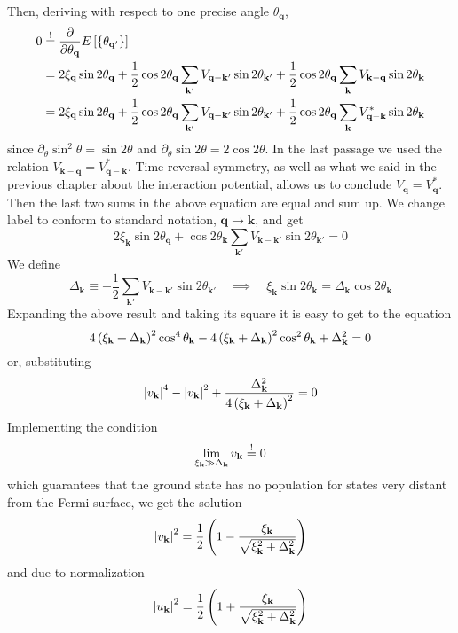 Then, deriving with respect to one precise angle $\theta_\mathbf{q}$,
\[
\begin{aligned}
	0 &\stackrel{!}{=} \pdv{}{\theta_\mathbf{q}} E\left[{\left\{{\theta_{\mathbf{q}'}}\right\}}\right] \\
	&= 2 \xi_\mathbf{q} \sin2\theta_\mathbf{q} + \frac{1}{2} 
	\cos2\theta_\mathbf{q} \sum_{\mathbf{k}'} V_{\mathbf{q}-\mathbf{k}'} \sin2\theta_{\mathbf{k}'} + \frac{1}{2} 
	\cos2\theta_\mathbf{q} \sum_\mathbf{k} V_{\mathbf{k}-\mathbf{q}} \sin2\theta_\mathbf{k} \\
	&= 2 \xi_\mathbf{q} \sin2\theta_\mathbf{q} + \frac{1}{2} 
	\cos2\theta_\mathbf{q} \sum_{\mathbf{k}'} V_{\mathbf{q}-\mathbf{k}'} \sin2\theta_{\mathbf{k}'} + \frac{1}{2} 
	\cos2\theta_\mathbf{q} \sum_\mathbf{k} V_{\mathbf{q}-\mathbf{k}}^* \sin2\theta_\mathbf{k}
\end{aligned}
\]
since $\partial_\theta \sin^2 \theta = \sin2\theta$ and $\partial_\theta \sin 2\theta = 2 \cos 2\theta$. In the last passage we used the relation $V_{\mathbf{k}-\mathbf{q}} = V_{\mathbf{q}-\mathbf{k}}^*$. Time-reversal symmetry, as well as what we said in the previous chapter about the interaction potential, allows us to conclude $V_\mathbf{q} = V_\mathbf{q}^*$. Then the last two sums in the above equation are equal and sum up. We change label to conform to standard notation, $\mathbf{q} \to \mathbf{k}$, and get
\[
	2 \xi_\mathbf{k} \sin2\theta_\mathbf{q} + 
	\cos2\theta_\mathbf{k} \sum_{\mathbf{k}'} V_{\mathbf{k}-\mathbf{k}'} \sin2\theta_{\mathbf{k}'} = 0
\]
We define
\begin{equation}\label{eq:delta variational definition}
	\Delta_\mathbf{k} \equiv - \frac{1}{2} 
	\sum_{\mathbf{k}'} V_{\mathbf{k}-\mathbf{k}'} \sin2\theta_{\mathbf{k}'}
	\quad\implies\quad
	\xi_\mathbf{k} \sin2\theta_\mathbf{k} = \Delta_\mathbf{k} \cos2\theta_\mathbf{k}
\end{equation}
Expanding the above result and taking its square it is easy to get to the equation
\[
	4 \left({\xi_\mathbf{k} + \Delta_\mathbf{k}}\right)^2 \cos^4\theta_\mathbf{k} - 4 \left({\xi_\mathbf{k} + \Delta_\mathbf{k}}\right)^2 \cos^2\theta_\mathbf{k} + \Delta_\mathbf{k}^2 = 0
\]
or, substituting
\[
	\abs{v_\mathbf{k}}^4 - \abs{v_\mathbf{k}}^2 + \frac{\Delta_\mathbf{k}^2}{4 \left({\xi_\mathbf{k} + \Delta_\mathbf{k}}\right)^2} = 0
\]
Implementing the condition
\[
	\lim_{\xi_\mathbf{k} \gg \Delta_\mathbf{k}} v_\mathbf{k} \stackrel{!}{=} 0
\]
which guarantees that the ground state has no population for states very distant from the Fermi surface, we get the solution
\begin{equation}\label{eq:v variational solution}
	\abs{v_\mathbf{k}}^2 = \frac{1}{2} \left({1 - \frac{\xi_\mathbf{k}}{\sqrt{\xi_\mathbf{k}^2 + \Delta_\mathbf{k}^2}}}\right) 
\end{equation}
and due to normalization
\begin{equation}\label{eq:u variational solution}
	\abs{u_\mathbf{k}}^2 = \frac{1}{2} \left({1 + \frac{\xi_\mathbf{k}}{\sqrt{\xi_\mathbf{k}^2 + \Delta_\mathbf{k}^2}}}\right) 
\end{equation}

